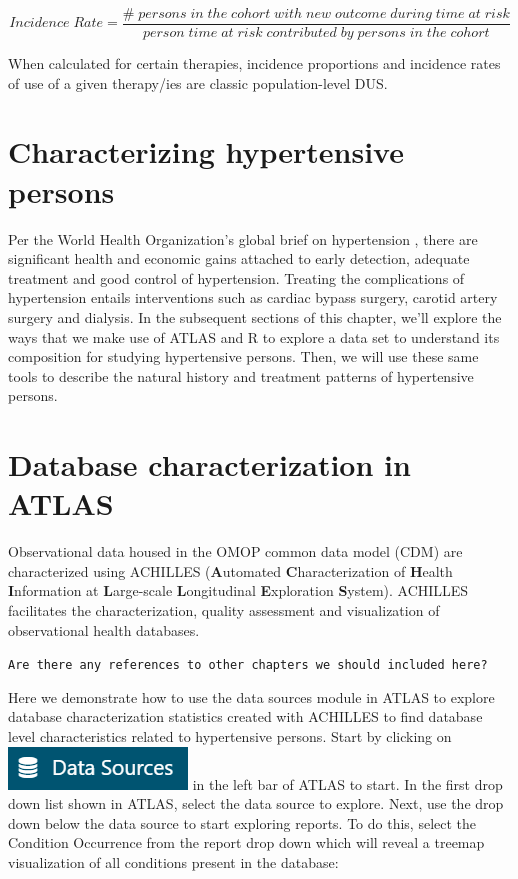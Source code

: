 \documentclass[11pt]{book}
\theoremstyle{definition}
\theoremstyle{definition}
\theoremstyle{definition}
\theoremstyle{remark}
\begin{document}
\begin{equation} 
Incidence\;Rate = \frac{\#\;persons\;in\;the\;cohort\;with\;new\;outcome\;during\;time\;at\;risk}{person\;time\;at\;risk\;contributed\;by\;persons\;in\;the\;cohort}
\end{equation}

When calculated for certain therapies, incidence proportions and incidence rates of use of a given therapy/ies are classic population-level DUS.

\hypertarget{characterizing-hypertensive-persons}{%
\section{Characterizing hypertensive persons}\label{characterizing-hypertensive-persons}}

Per the World Health Organization's global brief on hypertension \citep{WHOHypertension}, there are significant health and economic gains attached to early detection, adequate treatment and good control of hypertension. Treating the complications of hypertension entails interventions such as cardiac bypass surgery, carotid artery surgery and dialysis. In the subsequent sections of this chapter, we'll explore the ways that we make use of ATLAS and R to explore a data set to understand its composition for studying hypertensive persons. Then, we will use these same tools to describe the natural history and treatment patterns of hypertensive persons.

\hypertarget{database-characterization-in-atlas}{%
\section{Database characterization in ATLAS}\label{database-characterization-in-atlas}}

Observational data housed in the OMOP common data model (CDM) are characterized using ACHILLES (\textbf{A}utomated \textbf{C}haracterization of \textbf{H}ealth \textbf{I}nformation at \textbf{L}arge-scale \textbf{L}ongitudinal \textbf{E}xploration \textbf{S}ystem). ACHILLES facilitates the characterization, quality assessment and visualization of observational health databases.

\texttt{Are\ there\ any\ references\ to\ other\ chapters\ we\ should\ included\ here?}

Here we demonstrate how to use the data sources module in ATLAS to explore database characterization statistics created with ACHILLES to find database level characteristics related to hypertensive persons. Start by clicking on \includegraphics{images/Characterization/atlasDataSourcesMenuItem.png} in the left bar of ATLAS to start. In the first drop down list shown in ATLAS, select the data source to explore. Next, use the drop down below the data source to start exploring reports. To do this, select the Condition Occurrence from the report drop down which will reveal a treemap visualization of all conditions present in the database:
\end{document}

